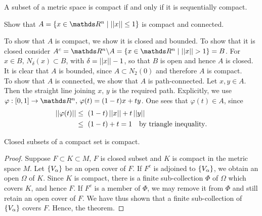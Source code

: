 \documentclass[../main-sheet.tex]{subfiles}
\begin{document}
\begin{thm}
    A subset of a metric space is compact if and only if it is sequentially compact.
\end{thm}
\newpage
\begin{prob}
    Show that $ A=\set{x\in \R^n\mid \norm{x}\leq 1} $ is compact and connected.
\end{prob}
\begin{soln}
    To show that $ A $ is compact, we show it is closed and bounded. To show that it is closed consider $ A^c=\R^n\backslash A=\set{x\in \R^n\mid \norm{x}> 1}=B $. For $ x\in B,\, N_\delta(x)\subset B $, with $ \delta=\left\vert\left\vert x\right\vert\right\vert-1 $, so that $ B $ is open and hence $ A $ is closed. It is clear that $ A $ is bounded, since $ A\subset N_2 (0) $ and therefore $ A $ is compact.\\

    To show that $ A $ is connected, we show that $ A $ is path-connected. Let $ x,y\in A $. Then the straight line joining $ x,\,y $ is the required path. Explicitly, we use $ \varphi:[0,1]\to \R^n,\,\varphi(t)=(1-t)x+ty $. One sees that $ \varphi(t)\in A $, since \begin{align*}
        \left\vert\left\vert\varphi(t)\right\vert\right\vert &\leq\ (1-t)\left\vert\left\vert x\right\vert\right\vert+t\left\vert\left\vert y\right\vert\right\vert\\
        &\leq\ (1-t)+t=1\quad\text{by triangle inequality}.
    \end{align*}
\end{soln}
\begin{thm}
    Closed subsets of a compact set is compact.
\end{thm}
\begin{proof}
    Suppose $ F\subset K\subset M,\, F $ is closed subset and $ K $ is compact in the metric space $ M $. Let $ \left\{V_\alpha\right\} $ be an open cover of $ F $. If $ F^c $ is adjoined to $ \left\{V_\alpha\right\} $, we obtain an open $ \Omega $ of $ K $. Since $ K $ is compact, there is a finite sub-collection $ \Phi $ of $ \Omega $ which covers $ K $, and hence $ F $. If $ F^c $ is a member of $ \Phi $, we may remove it from $ \Phi $ and still retain an open cover of $ F $. We have thus shown that a finite sub-collection of $ \left\{V_\alpha\right\} $ covers $ F $. Hence, the theorem.
\end{proof}
\end{document}
